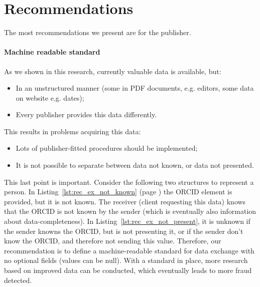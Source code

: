 \documentclass{ou-report}
\begin{document}
\section{Recommendations}
\label{sec:recommendations}


The most recommendations we present are for the publisher.

\paragraph{Machine readable standard}
As we shown in this research, currently valuable data is available, but:
\begin{itemize}
    \item In an unstructured manner (some in PDF documents, e.g. editors, some 
        data on website e.g. dates);
    \item Every publisher provides this data differently.
\end{itemize}
This results in problems acquiring this data:
\begin{itemize}
    \item Lots of publisher-fitted procedures should be implemented;
    \item It is not possible to separate between data not known, or data not 
    presented.
\end{itemize}
This last point is important. Consider the following two structures to represent
a person. In Listing~\ref{lst:rec_ex_not_known} (page
\pageref{lst:rec_ex_not_known}) the ORCID element is 
provided, but it is not known. The receiver (client requesting this data) knows 
that the ORCID is not known by the sender (which is eventually also information 
about data-completeness). In 
Listing~\ref{lst:rec_ex_not_present}, it is unknown if the sender knowns the 
ORCID, but is not presenting it, or if the sender don't know the ORCID, and 
therefore not sending this value.
Therefore, our recommendation is to define a machine-readable standard for data 
exchange with no optional fields (values can be null).
With a standard in place, more research based on improved data can be conducted,
which eventually leads to more fraud detected.
\end{document}
